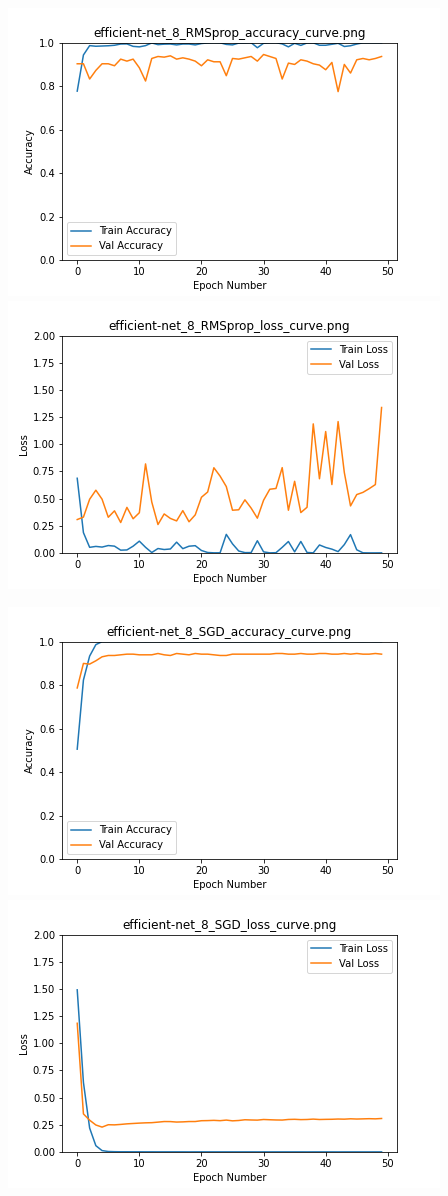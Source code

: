 \documentclass[UTF8]{ctexart}
\begin{document}
\includegraphics[scale=0.5]{image/efficient-net_8_RMSprop_accuracy_curve.png} 
\includegraphics[scale=0.5]{image/efficient-net_8_RMSprop_loss_curve.png} 

\includegraphics[scale=0.5]{image/efficient-net_8_SGD_accuracy_curve.png} 
\includegraphics[scale=0.5]{image/efficient-net_8_SGD_loss_curve.png}
\end{document}

